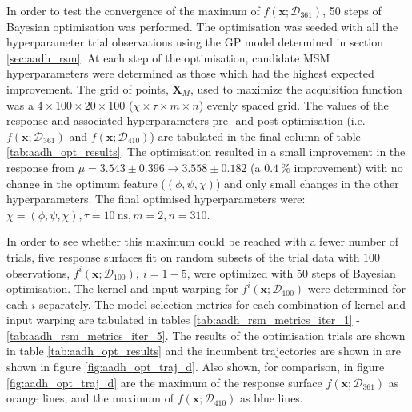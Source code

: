 In order to test the convergence of the maximum of $f\left(\mathbf{x}; \mathcal{D}_{361}\right)$, \num{50} steps of Bayesian optimisation was performed. The optimisation was seeded with all the hyperparameter trial observations using the GP model determined in section \ref{sec:aadh_rsm}. At each step of the optimisation, candidate MSM hyperparameters were determined as those which had the highest expected improvement. The grid of points, $\mathbf{X}_{M}$, used to maximize the acquisition function was a $4 \times 100 \times 20 \times 100$ ($\chi \times \tau \times m \times n$) evenly spaced grid. The values of the response and associated hyperparameters pre- and post-optimisation (i.e. $f\left(\mathbf{x}; \mathcal{D}_{361}\right)$ and $f\left(\mathbf{x}; \mathcal{D}_{410}\right)$) are tabulated in the final column of table \ref{tab:aadh_opt_results}. The optimisation resulted in a small improvement in the response from $\mu=3.543 \pm 0.396 \rightarrow 3.558 \pm 0.182$ (a $\SI{0.4}{\percent}$ improvement) with no change in the optimum feature ($(\phi, \psi, \chi)$) and only small changes in the other hyperparameters. The final optimised hyperparameters were: $\chi=(\phi, \psi, \chi), \tau=\SI{10}{\nano\second}, m=2, n=310$. 

In order to see whether this maximum could be reached with a fewer number of trials, five response surfaces fit on random subsets of the trial data with $100$ observations, $f^{i}\left(\mathbf{x};\mathcal{D}_{100}\right),\ i = 1 - 5$, were optimized with \num{50} steps of Bayesian optimisation. The kernel and input warping for $f^{i}\left(\mathbf{x};\mathcal{D}_{100}\right)$ were determined for each $i$ separately. The model selection metrics for each combination of kernel and input warping are tabulated in tables \ref{tab:aadh_rsm_metrics_iter_1} - \ref{tab:aadh_rsm_metrics_iter_5}. The results of the optimisation trials are shown in table \ref{tab:aadh_opt_results} and the incumbent trajectories are shown in are shown in figure \ref{fig:aadh_opt_traj_d}. Also shown, for comparison, in figure \ref{fig:aadh_opt_traj_d} are the maximum of the response surface $f\left(\mathbf{x};\mathcal{D}_{361}\right)$ as orange lines, and the maximum of $f\left(\mathbf{x};\mathcal{D}_{410}\right)$ as blue lines. 

